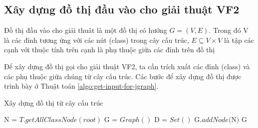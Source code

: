\documentclass[12pt]{report}
\newenvironment{thuattoan}[1][h]
  {\renewcommand{\algorithmcfname}{Thuật toán}
   \begin{algorithm}[#1]
  }{\end{algorithm}}
\begin{document}
\subsection{Xây dựng đồ thị đầu vào cho giải thuật VF2}
Đồ thị đầu vào cho giải thuât là một đồ thị có hướng $G = (V,E)$. Trong đó V là các đỉnh tương ứng với các nút (class) trong cây cấu trúc, $E \subseteq V \times V$ là tập các cạnh với thuộc tính trên cạnh là phụ thuộc giữa các đỉnh trên đồ thị 

\noindent Để xây dựng đồ thị gọi cho giải thuật VF2, ta cần trích xuất các đỉnh (class) và các phụ thuộc giữa chúng từ cây cấu trúc. Các bước để xây dựng đồ thị được trình bày ở Thuật toán \ref{algo:get-input-for-jgraph}.

\begin{thuattoan}
	\label{algo:get-input-for-jgraph}
	\caption{Xây dựng đồ thị từ cây cấu trúc}
	N = $T.getAllClassNode(root)$\;
	G = $Graph()$\;
	 D = $Set()$\;
	G.$addNode($N$)$\;
	\Return G \;
	
\end{thuattoan}
\end{document}
